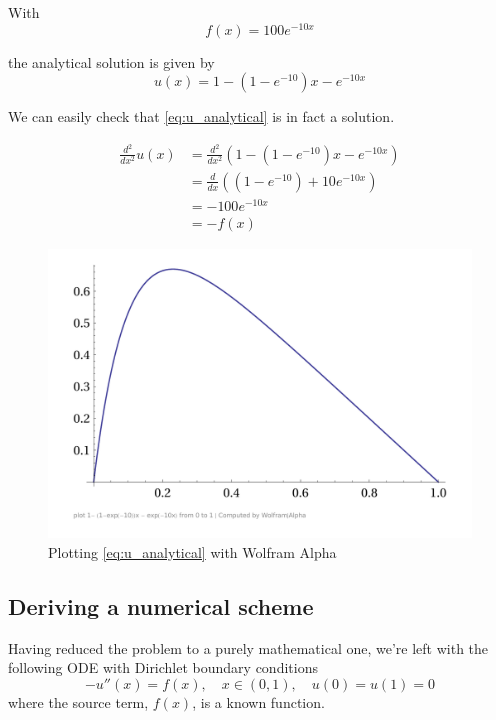 \documentclass[a4paper]{article}
\begin{document}
With
\begin{equation}
    f(x) = 100e^{-10x}
\end{equation}

the analytical solution is given by
\begin{equation}
    u(x) = 1-(1-e^{-10})x-e^{-10x}
    \label{eq:u_analytical}
\end{equation}

We can easily check that \eqref{eq:u_analytical} is in fact a solution.

\begin{align*}
    \frac{d^2}{dx^2}  u(x)
    &= \frac{d^2}{dx^2} \left( 1-(1-e^{-10})x-e^{-10x} \right) \\
    &= \frac{d}{dx} \left( (1-e^{-10})+10e^{-10x} \right) \\
    &= -100e^{-10x} \\
    &= -f(x)
\end{align*}

\begin{figure}[ht]
\includegraphics[width=\textwidth]{fig/exact_solution_wolfram_alpha_plot}
\caption{Plotting \eqref{eq:u_analytical} with Wolfram Alpha}
\end{figure}

\subsection{Deriving a numerical scheme}
Having reduced the problem to a purely mathematical one, we're left with the following ODE with Dirichlet boundary conditions
\begin{equation}
    -u''(x) = f(x), \quad x\in(0,1), \quad u(0) = u(1) = 0
    \label{eq:ddu_dxx_cont}
\end{equation}
where the source term, $f(x)$, is a known function.
\end{document}
